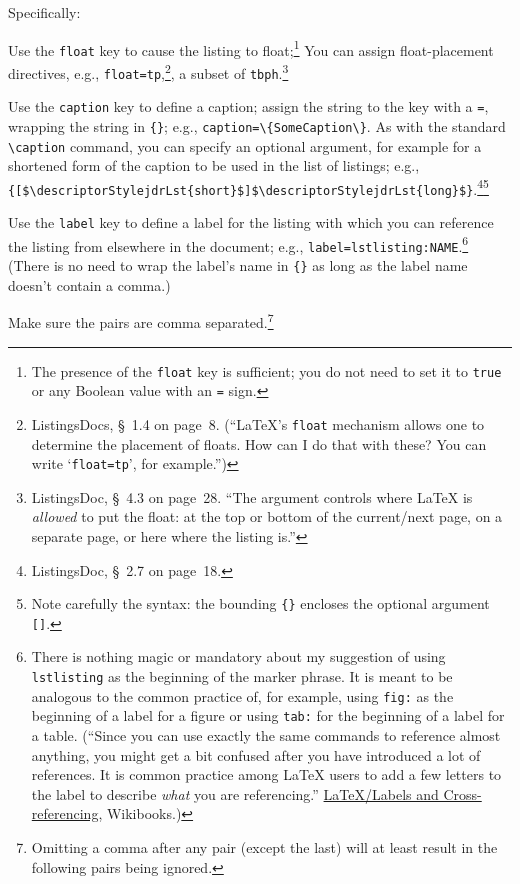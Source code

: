 \documentclass[12pt,table,final]{article}%
\begin{document}
Specifically:
\begin{jdr_itemize}
  \item Use the \lstinline|float| key to cause the listing to float;\footnote{The presence of the \lstinline|float| key is sufficient; you do not need to set it to \lstinline|true| or any Boolean value with an \lstinline|=| sign.} You can assign float-placement directives, e.g., \lstinline|float=tp|,\footnote{ListingsDocs, §~1.4 on page~8. (``\LaTeX's \lstinline|float| mechanism allows one to determine the placement of floats. How can I do that with these? You can write `\texttt{float=tp}', for example.'')}, a subset of \lstinline|tbph|.\footnote{ListingsDoc, §~4.3 on page~28. ``The argument controls where \LaTeX{} is \emph{allowed} to put the float: at the top or bottom of the current/next page, on a separate page, or here where the listing is.''}
  \item Use the \lstinline|caption| key to define a caption; assign the string to the key with a \lstinline|=|, wrapping the string in \lstinline|{}|; e.g., \mbox{\lstinline|caption=\{SomeCaption\}|}. As with the standard \lstinline|\caption| command, you can specify an optional argument, for example for a shortened form of the caption to be used in the list of listings; e.g., \lstinline[mathescape]|{[$\descriptorStylejdrLst{short}$]$\descriptorStylejdrLst{long}$}|.\footnote{ListingsDoc, §~2.7 on page~18.}\footnote{Note carefully the syntax: the bounding \lstinline|{}| encloses the optional argument \lstinline|[]|.}
  \item Use the \lstinline|label| key to define a label for the listing with which you can reference the listing from elsewhere in the document; e.g., \mbox{\lstinline|label=lstlisting:NAME|}.\footnote{There is nothing magic or mandatory about my suggestion of using \lstinline|lstlisting| as the beginning of the marker phrase. It is meant to be analogous to the common practice of, for example, using \lstinline|fig:| as the beginning of a label for a figure or using \lstinline|tab:| for the beginning of a label for a table. (``Since you can use exactly the same commands to reference almost anything, you might get a bit confused after you have introduced a lot of references. It is common practice among \LaTeX{} users to add a few letters to the label to describe \emph{what} you are referencing.'' \href{https://en.wikibooks.org/wiki/LaTeX/Labels_and_Cross-referencing}{\LaTeX/Labels and Cross-referencing}, Wikibooks.)} (There is no need to wrap the label's name in \lstinline|{}| as long as the label name doesn't contain a comma.)
  \item Make sure the  pairs are comma separated.\footnote{Omitting a comma after any  pair (except the last) will at least result in the following  pairs being ignored.}
\end{jdr_itemize}
\end{document}
